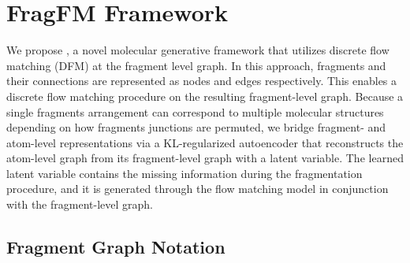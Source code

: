 \section{FragFM Framework}
\label{sec:fragfm_framework}

We propose \methodname{}, a novel molecular generative framework that utilizes discrete flow matching (DFM) at the fragment level graph.
In this approach, fragments and their connections are represented as nodes and edges respectively.
This enables a discrete flow matching procedure on the resulting fragment-level graph. 
Because a single fragments arrangement can correspond to multiple molecular structures depending on how fragments junctions are permuted, we bridge fragment- and atom-level representations via a KL-regularized autoencoder that reconstructs the atom-level graph from its fragment-level graph with a latent variable. 
The learned latent variable contains the missing information during the fragmentation procedure, and it is generated through the flow matching model in conjunction with the fragment-level graph.

\subsection{Fragment Graph Notation} 
\label{subsec:Fragment notation}

